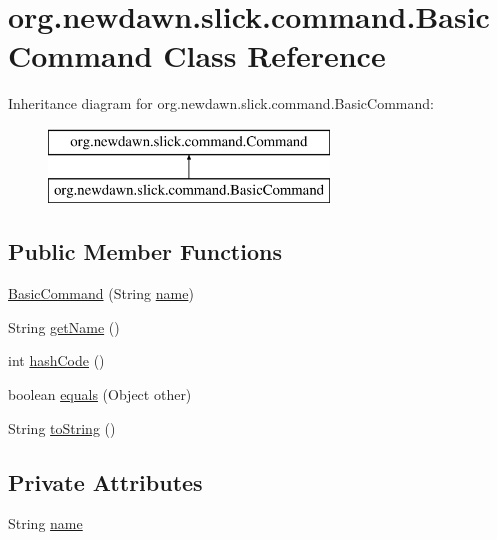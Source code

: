 \hypertarget{classorg_1_1newdawn_1_1slick_1_1command_1_1_basic_command}{}\section{org.\+newdawn.\+slick.\+command.\+Basic\+Command Class Reference}
\label{classorg_1_1newdawn_1_1slick_1_1command_1_1_basic_command}
Inheritance diagram for org.\+newdawn.\+slick.\+command.\+Basic\+Command\+:\begin{figure}[H]
\begin{center}
\leavevmode
\includegraphics[height=2.000000cm]{classorg_1_1newdawn_1_1slick_1_1command_1_1_basic_command}
\end{center}
\end{figure}
\subsection*{Public Member Functions}
\begin{DoxyCompactItemize}
\item 
\mbox{\hyperlink{classorg_1_1newdawn_1_1slick_1_1command_1_1_basic_command_acce30aa06b3b68b146e45f603a2053a8}{Basic\+Command}} (String \mbox{\hyperlink{classorg_1_1newdawn_1_1slick_1_1command_1_1_basic_command_a50a5c3e66d1f02b990807d882daddce2}{name}})
\item 
String \mbox{\hyperlink{classorg_1_1newdawn_1_1slick_1_1command_1_1_basic_command_a9e8b97567e43625664eadefb2789aca5}{get\+Name}} ()
\item 
int \mbox{\hyperlink{classorg_1_1newdawn_1_1slick_1_1command_1_1_basic_command_a92181ea905147c3e2b869347e40cad0c}{hash\+Code}} ()
\item 
boolean \mbox{\hyperlink{classorg_1_1newdawn_1_1slick_1_1command_1_1_basic_command_a67ef131d3d6489ef5fc1bd6f1a595caa}{equals}} (Object other)
\item 
String \mbox{\hyperlink{classorg_1_1newdawn_1_1slick_1_1command_1_1_basic_command_acbf44f5b863bf9e38387880905e64949}{to\+String}} ()
\end{DoxyCompactItemize}
\subsection*{Private Attributes}
\begin{DoxyCompactItemize}
\item 
String \mbox{\hyperlink{classorg_1_1newdawn_1_1slick_1_1command_1_1_basic_command_a50a5c3e66d1f02b990807d882daddce2}{name}}
\end{DoxyCompactItemize}


